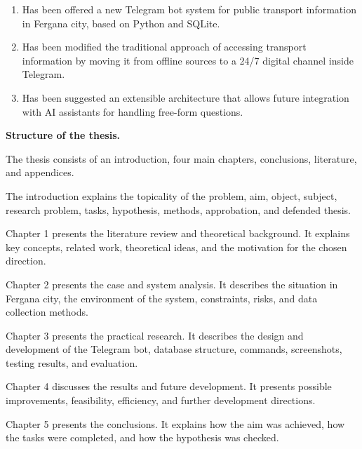\begin{enumerate}
    \item Has been offered a new Telegram bot system for public transport information in Fergana city, based on Python and SQLite.
    \item Has been modified the traditional approach of accessing transport information by moving it from offline sources to a 24/7 digital channel inside Telegram.
    \item Has been suggested an extensible architecture that allows future integration with AI assistants for handling free-form questions.
\end{enumerate}

\textbf{Structure of the thesis.}

The thesis consists of an introduction, four main chapters, conclusions, literature, and appendices.

The introduction explains the topicality of the problem, aim, object, subject, research problem, tasks, hypothesis, methods, approbation, and defended thesis.

Chapter 1 presents the literature review and theoretical background. It explains key concepts, related work, theoretical ideas, and the motivation for the chosen direction.

Chapter 2 presents the case and system analysis. It describes the situation in Fergana city, the environment of the system, constraints, risks, and data collection methods.

Chapter 3 presents the practical research. It describes the design and development of the Telegram bot, database structure, commands, screenshots, testing results, and evaluation.

Chapter 4 discusses the results and future development. It presents possible improvements, feasibility, efficiency, and further development directions.

Chapter 5 presents the conclusions. It explains how the aim was achieved, how the tasks were completed, and how the hypothesis was checked.